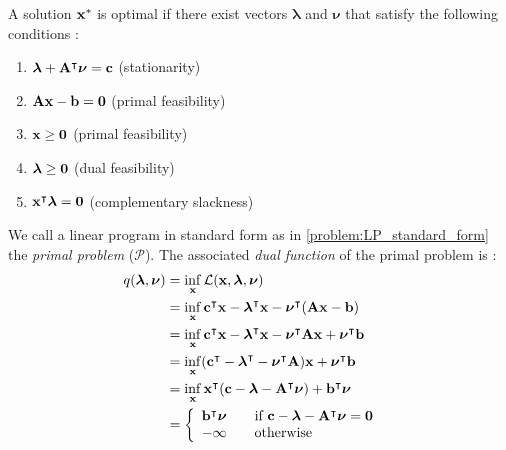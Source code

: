 \newpage
\begin{theorem} \label{theorem:lp_duality}
    A solution $\bold x^*$ is optimal if there exist vectors $\boldsymbol \lambda$ and $\boldsymbol \nu$ that satisfy the following conditions \cite{noauthor_numerical_2006}:
    \begin{enumerate}
        \item $\boldsymbol \lambda + \bold A^\intercal \boldsymbol \nu = \bold c $ \hfill (stationarity)
        \item $ \bold A \bold x - \bold b = \bold 0$ \hfill (primal feasibility)
        \item $\bold x \geq \bold 0$ \hfill (primal feasibility)
        \item $\boldsymbol \lambda \geq \bold 0$ \hfill (dual feasibility)
        \item $\bold x^\intercal \boldsymbol \lambda = \bold 0$ \hfill (complementary slackness)
    \end{enumerate}
\end{theorem} 
We call a linear program in standard form as in \cref{problem:LP_standard_form} the \textit{primal problem} ($\mathcal{P}$).
The associated \textit{dual function} of the primal problem is \cite{aps_mosek_nodate, boyd_stephen_convex_2004}:
\begin{align*}
    q(\boldsymbol \lambda, \boldsymbol \nu)
    & = \inf_{\bold x} \mathcal{L} (\bold x, \boldsymbol \lambda, \boldsymbol \nu) \\
    & = \inf_{\bold x} \bold c^\intercal \bold x - \boldsymbol \lambda^\intercal \bold x - \boldsymbol \nu^\intercal (\bold A \bold x - \bold b) & \\
    & = \inf_{\bold x} \bold c^\intercal \bold x - \boldsymbol \lambda^\intercal \bold x - \boldsymbol \nu^\intercal \bold A \bold x + \boldsymbol \nu^\intercal \bold b  &\\
    & = \inf_{\bold x} (\bold c^\intercal - \boldsymbol \lambda^\intercal - \boldsymbol \nu^\intercal \bold A) \bold x + \boldsymbol \nu^\intercal \bold b  &\\
    & = \inf_{\bold x} \bold x^\intercal (\bold c - \boldsymbol \lambda - \bold A^\intercal \boldsymbol \nu) + \bold b^\intercal \boldsymbol \nu &\\
    & = \left\{
    \begin{array}{lr}
        \bold b^\intercal \boldsymbol \nu \quad \quad \text{if} \, \, \bold c - \boldsymbol \lambda - \bold A^\intercal \boldsymbol \nu = \bold 0\\
        - \infty \quad \quad \text{otherwise}
    \end{array}
    \right.
\end{align*}

